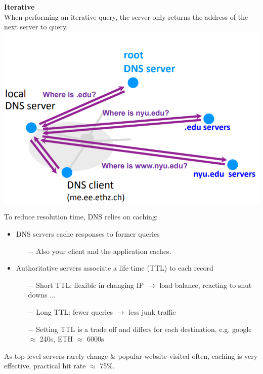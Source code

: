 \documentclass[a4paper, fontsize=8pt, landscape, DIV=1]{scrartcl}
\begin{document}
\begin{multicols*}{4}
		\textbf{Iterative}\\
		When performing an iterative query, the server only returns the address of the
		next server to query.\\
		
		\includegraphics[width=\columnwidth]{images/Application_Layer/dns_iterative.png}
		\par 
		
		To reduce resolution time, DNS relies on caching:
		\begin{itemize}[noitemsep]
			\item DNS servers cache responses to former queries
			\begin{itemize}
				\item[$-$] Also your client and the application caches.
			\end{itemize}
			\item Authoritative servers associate a life time (TTL) to each record
			\begin{itemize}
				\item[$-$] Short TTL: flexible in changing IP $\rightarrow$ load balance,
				reacting to shut downs ...
				\item[$-$] Long TTL: fewer queries $\rightarrow$ less junk traffic
				\item[$-$] Setting TTL is a trade off and differs for each destination, e.g.
				google $\approx$ 240s, ETH $\approx$ 6000s
			\end{itemize}
		\end{itemize}
		As top-level servers rarely change \& popular website visited often, caching
		is very effective, practical hit rate $\approx$ 75\%.
		

\end{multicols*}
\end{document}
